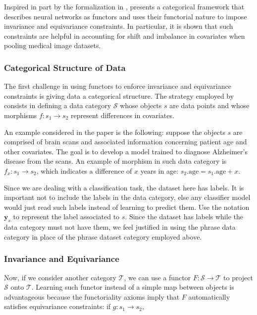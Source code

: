 \documentclass[11pt,a4paper,openright,twoside]{report}
\theoremstyle{plain}
\theoremstyle{definition}
\begin{document}
Inspired in part by the formalization in \cite{gavranovic2019compositional}, \cite{chytas2024poolingimagedatasetsmultiple} presents a categorical framework that describes neural networks as functors and uses their functorial nature to impose invariance and equivariance constraints. In particular, it is shown that such constraints are helpful in accounting for shift and imbalance in covariates when pooling medical image datasets.


\subsubsection{Categorical Structure of Data}

The first challenge in using functors to enforce invariance and equivariance constraints is giving data a categorical structure. The strategy employed by \cite{chytas2024poolingimagedatasetsmultiple} consists in defining a data category $\mathcal{S}$ whose objects $s$ are data points and whose morphisms $f: s_1 \to s_2$ represent differences in covariates. 


An example considered in the paper is the following: suppose the objects $s$ are comprised of brain scans and associated information concerning patient age and other covariates. The goal is to develop a model trained to diagnose Alzheimer's disease from the scans. An example of morphism in such data category is $f_x: s_1 \to s_2$, which indicates a difference of $x$ years in age: $s_2.\mathrm{age} = s_1.\mathrm{age} + x$.


Since we are dealing with a classification task, the dataset here has labels. It is important not to include the labels in the data category, else any classifier model would just read such labels instead of learning to predict them. Use the notation $\mathbf{y}_s$ to represent the label associated to $s$. Since the dataset has labels while the data category must not have them, we feel justified in using the phrase data category in place of the phrase dataset category employed above.


\subsubsection{Invariance and Equivariance}


Now, if we consider another category $\mathcal{T}$, we can use a functor $F: \mathcal{S} \to \mathcal{T}$ to project $\mathcal{S}$ onto $\mathcal{T}$. Learning such functor instead of a simple map between objects is advantageous because the functoriality axioms imply that $F$ automatically satisfies equivariance constraints: if $g: s_1 \to s_2$,
\end{document}
